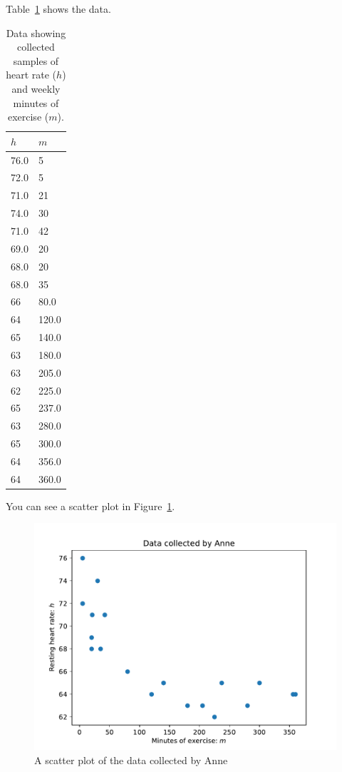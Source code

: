Table~\ref{tab:data_collected_by_anne} shows the data.

\begin{table}[!htbp]
\begin{center}
\begin{tabular}{ll}
\toprule
\(h\) & \(m\)\\
\midrule
76.0 & 5\\
72.0 & 5\\
71.0 & 21\\
74.0 & 30\\
71.0 & 42\\
69.0 & 20\\
68.0 & 20\\
68.0 & 35\\
66 & 80.0\\
64 & 120.0\\
65 & 140.0\\
63 & 180.0\\
63 & 205.0\\
62 & 225.0\\
65 & 237.0\\
63 & 280.0\\
65 & 300.0\\
64 & 356.0\\
64 & 360.0\\
\bottomrule
\end{tabular}
    \caption{Data showing collected samples of heart rate (\(h\)) and weekly
    minutes of exercise (\(m\)).}
    \label{tab:data_collected_by_anne}
\end{center}
\end{table}



You can see a scatter plot in
Figure~\ref{fig:data_collected_by_anne}.

\begin{figure}[!hbtp]
\begin{center}
\includegraphics[width=.7\textwidth]{./assets/data_collected_by_anne/main.pdf}
\end{center}
\caption{A scatter plot of the data collected by Anne}
\label{fig:data_collected_by_anne}
\end{figure}

